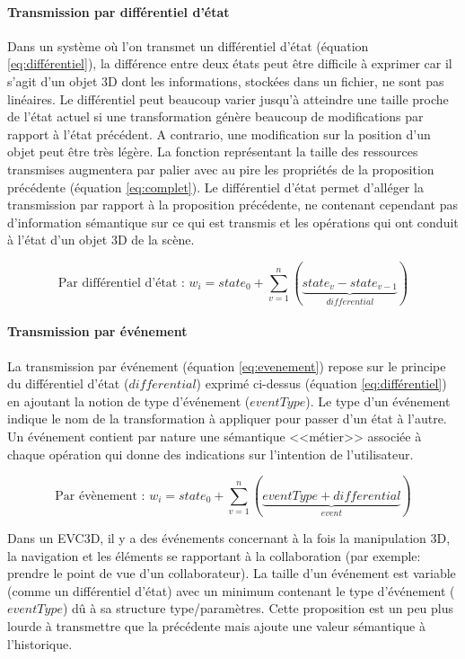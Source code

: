 \paragraph{Transmission par différentiel d'état}
\label{par:diff}
Dans un système où l'on transmet un différentiel d'état (équation 
\ref{eq:différentiel}), la différence entre deux états peut être difficile à exprimer 
 car il s'agit d'un objet 3D dont les informations, stockées dans 
un fichier, ne sont pas linéaires. Le différentiel peut beaucoup varier jusqu'à 
atteindre une taille proche de l'état actuel si une transformation génère beaucoup 
de modifications par rapport à l'état précédent. A contrario, une modification sur la 
position d'un objet peut être très légère. La fonction représentant la taille des 
ressources transmises augmentera par palier avec au pire les propriétés de la 
proposition précédente (équation \ref{eq:complet}). Le différentiel d'état permet 
d'alléger la transmission par rapport à la proposition précédente, ne contenant 
cependant pas d'information sémantique sur ce qui est transmis et les opérations 
qui ont conduit à l'état d'un objet 3D de la scène.

\begin{equation}
\label{eq:différentiel}
\text{Par différentiel d'état : } w_i = state_0 + \sum_{v=1}^{n}(\underbrace{state_{v} 
- state_{v-1}}_{differential})
\end{equation}

\paragraph{Transmission par événement}
La transmission par événement (équation \ref{eq:evenement}) repose sur le 
principe du différentiel d'état ($differential$) exprimé ci-dessus (équation 
\ref{eq:différentiel}) en ajoutant la notion de type d'événement ($eventType$). Le 
type d'un événement indique le nom de la transformation à appliquer pour passer 
d'un état à l'autre. Un événement contient par nature une sémantique <<métier>> 
associée à chaque opération qui donne des indications sur l'intention de 
l'utilisateur. 

\begin{equation}
\label{eq:evenement}
\text{Par évènement : } w_i= state_0 + \sum_{v=1}^{n}(\underbrace{eventType + 
differential}_{event}) 
\end{equation}

Dans un \gls{EVC3D}, il y a des événements concernant à la fois la manipulation 
3D, la navigation et les éléments se rapportant à la collaboration (par exemple: 
prendre le point de vue d'un collaborateur). La taille d'un événement est variable 
(comme un différentiel d'état) avec un minimum contenant le type d'événement 
($eventType$) dû à sa structure type/paramètres. Cette proposition est un peu 
plus lourde à transmettre que la précédente mais ajoute une valeur sémantique à 
l'historique.
